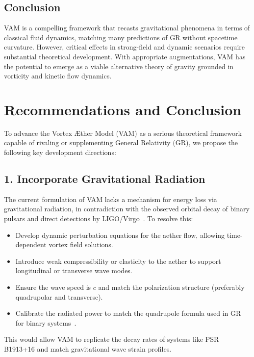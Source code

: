 \subsection*{Conclusion}

VAM is a compelling framework that recasts gravitational phenomena in terms of classical fluid dynamics, matching many predictions of GR without spacetime curvature. However, critical effects in strong-field and dynamic scenarios require substantial theoretical development. With appropriate augmentations, VAM has the potential to emerge as a viable alternative theory of gravity grounded in vorticity and kinetic flow dynamics.

\section{Recommendations and Conclusion}

To advance the Vortex Æther Model (VAM) as a serious theoretical framework capable of rivaling or supplementing General Relativity (GR), we propose the following key development directions:

\subsection*{1. Incorporate Gravitational Radiation}

The current formulation of VAM lacks a mechanism for energy loss via gravitational radiation, in contradiction with the observed orbital decay of binary pulsars and direct detections by LIGO/Virgo~\cite{abbott2016}. To resolve this:

\begin{itemize}
    \item Develop dynamic perturbation equations for the aether flow, allowing time-dependent vortex field solutions.
    \item Introduce weak compressibility or elasticity to the aether to support longitudinal or transverse wave modes.
    \item Ensure the wave speed is $c$ and match the polarization structure (preferably quadrupolar and transverse).
    \item Calibrate the radiated power to match the quadrupole formula used in GR for binary systems~\cite{weisberg2016}.
\end{itemize}

This would allow VAM to replicate the decay rates of systems like PSR B1913+16 and match gravitational wave strain profiles.

